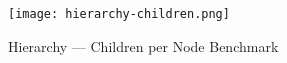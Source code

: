 \begin{figure}[H]
    \centering
    \texttt{[image: hierarchy-children.png]}
    \caption{Hierarchy --- Children per Node Benchmark}\label{fig:hierarchy_children_bm}
\end{figure}